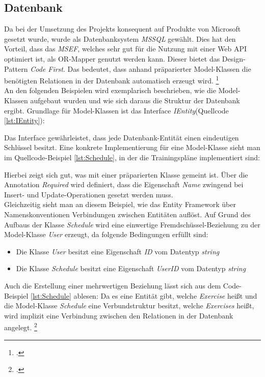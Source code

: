 \subsection{Datenbank}
\label{ssec:aufbau-server-db}
Da bei der Umsetzung des Projekts konsequent auf Produkte von Microsoft gesetzt wurde, wurde als Datenbanksystem \textit{\ac{MSSQL}} gewählt. Dies hat den Vorteil, dass das \textit{\gls{MSEF}}, welches sehr gut für die Nutzung mit einer Web \ac{API} optimiert ist, als \gls{OR-Mapper} genutzt werden kann. Dieser bietet das Design-Pattern \textit{Code First}. Das bedeutet, dass anhand präparierter Model-Klassen die benötigten Relationen in der Datenbank automatisch erzeugt wird. \footcite{entity-framework-code-first}\\
An den folgenden Beispielen wird exemplarisch beschrieben, wie die Model-Klassen aufgebaut wurden und wie sich daraus die Struktur der Datenbank ergibt. Grundlage für Model-Klassen ist das Interface \textit{IEntity}(Quellcode \ref{lst:IEntity}):

Das Interface gewährleistet, dass jede Datenbank-Entität einen eindeutigen Schlüssel besitzt.
Eine konkrete Implementierung für eine Model-Klasse sieht man im Quellcode-Beispiel \ref{lst:Schedule}, in der die Trainingspläne implementiert sind:

Hierbei zeigt sich gut, was mit einer präparierten Klasse gemeint ist. Über die Annotation \textit{Required} wird definiert, dass die Eigenschaft \textit{Name} zwingend bei Insert- und Update-Operationen gesetzt werden muss. \\
Gleichzeitig sieht man an diesem Beispiel, wie das Entity Framework über Namenskonventionen Verbindungen zwischen Entitäten auflöst. Auf Grund des Aufbaus der Klasse \textit{Schedule} wird eine einwertige Fremdschüssel-Beziehung zu der Model-Klasse \textit{User} erzeugt, da folgende Bedingungen erfüllt sind:
\begin{itemize}
\item Die Klasse \textit{User} besitzt eine Eigenschaft \textit{ID} vom Datentyp \textit{string}
\item Die Klasse \textit{Schedule} besitzt eine Eigenschaft \textit{UserID} vom Datentyp \textit{string}
\end{itemize}
Auch die Erstellung einer mehrwertigen Beziehung lässt sich aus dem Code-Beispiel \ref{lst:Schedule} ablesen: Da es eine Entität gibt, welche \textit{Exercise} heißt und die Model-Klasse \textit{Schedule} eine Verbundstruktur besitzt, welche \textit{Exercises} heißt, wird implizit eine Verbindung zwischen den Relationen in der Datenbank angelegt. \footcite{entity-framework-code-first}
